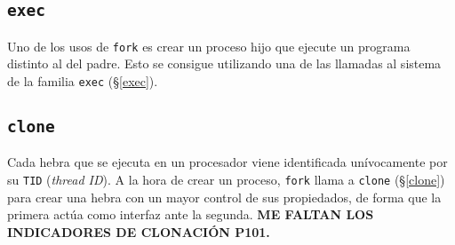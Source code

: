 \subsection{\texttt{exec}}

Uno de los usos de \texttt{fork} es crear un proceso hijo que ejecute un programa distinto al del padre.
Esto se consigue utilizando una de las llamadas al sistema de la familia \texttt{exec} (\S\ref{exec}).

\subsection{\texttt{clone}}

Cada hebra que se ejecuta en un procesador viene identificada unívocamente por su \texttt{TID} (\emph{thread ID}).
A la hora de crear un proceso, \texttt{fork} llama a \texttt{clone} (\S\ref{clone})  para crear una hebra con un mayor control de sus propiedados, de forma que la primera actúa como interfaz ante la segunda.
\textbf{ME FALTAN LOS INDICADORES DE CLONACIÓN P101.}

